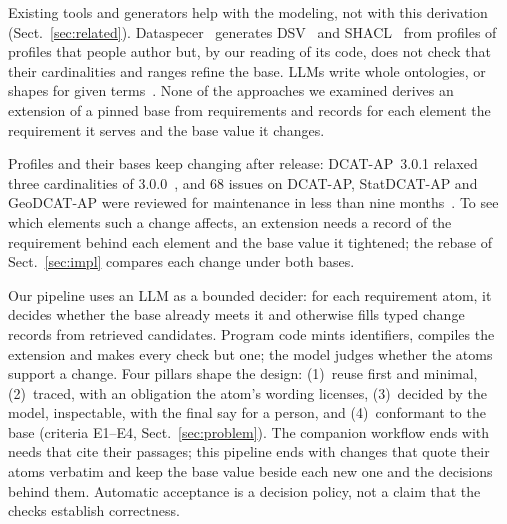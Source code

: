 Existing tools and generators help with the modeling, not with this derivation
(Sect.~\ref{sec:related}). Dataspecer~\cite{stenchlak2022dataspecer,klimek2024dataspecer} generates
\ac{DSV}~\cite{klimek2026dsv} and \ac{SHACL}~\cite{w3cshacl} from profiles of profiles that people author but, by
our reading of its code, does not check that their cardinalities and ranges refine the base. \Acp{LLM} write whole
ontologies, or shapes for given terms~\cite{lippolis2025ontology,fathallah2026rigor,zhou2026nl2shacl}. None of
the approaches we examined derives an extension of a pinned base from requirements and records for each element
the requirement it serves and the base value it changes. 

Profiles and their bases keep changing after release: \acs{DCAT-AP}~3.0.1 relaxed three cardinalities of %
3.0.0~\cite{semicdcatap301}, and 68 issues on \acs{DCAT-AP}, StatDCAT-AP and GeoDCAT-AP were reviewed for
maintenance in less than nine months~\cite{dragan2019maintenance}. To see which elements such a change affects, %
an extension needs a record of the requirement behind each element and the base value it tightened; the rebase
of Sect.~\ref{sec:impl} compares each change under both bases.

Our pipeline uses an \acs{LLM} as a bounded decider: for each requirement atom, it decides whether the base
already meets it and otherwise fills typed change records from retrieved candidates. Program code mints
identifiers, compiles the extension and makes every check but one; the model judges whether the atoms support a
change. Four pillars shape the design: (1)~reuse first and minimal, (2)~traced, with an obligation the atom's %
wording licenses, (3)~decided by the model, inspectable, with the final say for a person, and
(4)~conformant to the base (criteria E1--E4, Sect.~\ref{sec:problem}). The companion workflow ends with needs %
that cite their passages; this pipeline ends with changes that quote their atoms verbatim and keep the base value
beside each new one and the decisions behind them. Automatic acceptance is a decision policy, not a claim that
the checks establish correctness.

